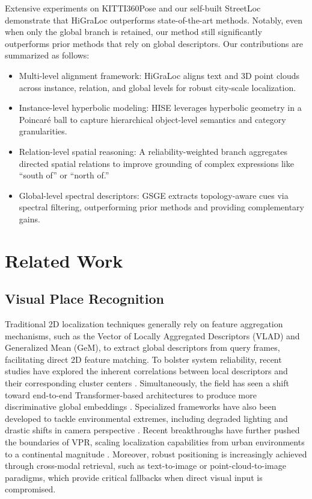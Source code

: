\documentclass{article}
\begin{document}
Extensive experiments on KITTI360Pose and our self-built StreetLoc demonstrate that HiGraLoc outperforms state-of-the-art methods. Notably, even when only the global branch is retained, our method still significantly outperforms prior methods that rely on global descriptors. Our contributions are summarized as follows:
\begin{itemize}
    \item Multi-level alignment framework: HiGraLoc aligns text and 3D point clouds across instance, relation, and global levels for robust city-scale localization.  
    \item Instance-level hyperbolic modeling: HISE leverages hyperbolic geometry in a Poincaré ball to capture hierarchical object-level semantics and category granularities.    
    \item Relation-level spatial reasoning: A reliability-weighted branch aggregates directed spatial relations to improve grounding of complex expressions like ``south of'' or ``north of.''    
    \item Global-level spectral descriptors: GSGE extracts topology-aware cues via spectral filtering, outperforming prior methods and providing complementary gains.
\end{itemize}
\section{Related Work}
\subsection{Visual Place Recognition}
Traditional 2D localization techniques generally rely on feature aggregation mechanisms, such as the Vector of Locally Aggregated Descriptors (VLAD) \cite{arandjelovic2016netvlad} and Generalized Mean (GeM), to extract global descriptors from query frames, facilitating direct 2D feature matching. To bolster system reliability, recent studies have explored the inherent correlations between local descriptors and their corresponding cluster centers \cite{li20252}. Simultaneously, the field has seen a shift toward end-to-end Transformer-based architectures to produce more discriminative global embeddings \cite{wang2022transvpr,li2024feature}. Specialized frameworks have also been developed to tackle environmental extremes, including degraded lighting \cite{li2024toward} and drastic shifts in camera perspective \cite{berton2023eigenplaces}. Recent breakthroughs have further pushed the boundaries of VPR, scaling localization capabilities from urban environments to a continental magnitude \cite{lindenberger2025scaling}. Moreover, robust positioning is increasingly achieved through cross-modal retrieval, such as text-to-image \cite{shang2025bridging} or point-cloud-to-image \cite{xu2024c2l} paradigms, which provide critical fallbacks when direct visual input is compromised.
\end{document}
